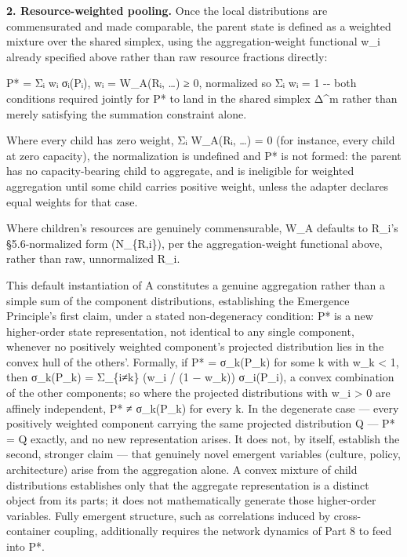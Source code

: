 \documentclass[
]{article}
\begin{document}
\textbf{2. Resource-weighted pooling.} Once the local distributions are
commensurated and made comparable, the parent state is defined as a
weighted mixture over the shared simplex, using the aggregation-weight
functional w\_i already specified above rather than raw resource
fractions directly:

P* = Σᵢ wᵢ σᵢ(Pᵢ), wᵢ = W\_A(Rᵢ, \ldots) ≥ 0, normalized so Σᵢ wᵢ = 1
-\/- both conditions required jointly for P* to land in the shared
simplex Δ\^{}m rather than merely satisfying the summation constraint
alone.

Where every child has zero weight, Σᵢ W\_A(Rᵢ, \ldots) = 0 (for
instance, every child at zero capacity), the normalization is undefined
and P* is not formed: the parent has no capacity-bearing child to
aggregate, and is ineligible for weighted aggregation until some child
carries positive weight, unless the adapter declares equal weights for
that case.

Where children's resources are genuinely commensurable, W\_A defaults to
R\_i's §5.6-normalized form (N\_\{R,i\}), per the aggregation-weight
functional above, rather than raw, unnormalized R\_i.

This default instantiation of A constitutes a genuine aggregation rather
than a simple sum of the component distributions, establishing the
Emergence Principle's first claim, under a stated non-degeneracy
condition: P* is a new higher-order state representation, not identical
to any single component, whenever no positively weighted component's
projected distribution lies in the convex hull of the others'. Formally,
if P* = σ\_k(P\_k) for some k with w\_k \textless{} 1, then σ\_k(P\_k) =
Σ\_\{i≠k\} (w\_i / (1 − w\_k)) σ\_i(P\_i), a convex combination of the
other components; so where the projected distributions with w\_i
\textgreater{} 0 are affinely independent, P* ≠ σ\_k(P\_k) for every k.
In the degenerate case --- every positively weighted component carrying
the same projected distribution Q --- P* = Q exactly, and no new
representation arises. It does not, by itself, establish the second,
stronger claim --- that genuinely novel emergent variables (culture,
policy, architecture) arise from the aggregation alone. A convex mixture
of child distributions establishes only that the aggregate
representation is a distinct object from its parts; it does not
mathematically generate those higher-order variables. Fully emergent
structure, such as correlations induced by cross-container coupling,
additionally requires the network dynamics of Part 8 to feed into P*.
\end{document}
